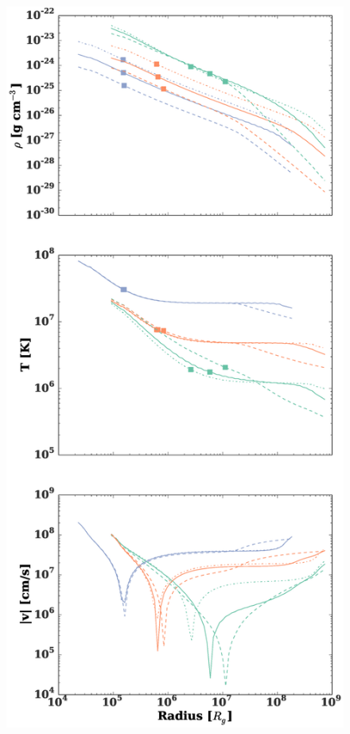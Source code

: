\documentclass[usenatbib,fleqn]{mn2e}
\begin{document}
\begin{figure}
  \includegraphics[width=\columnwidth]{profiles.eps}

\end{figure}
\end{document}
